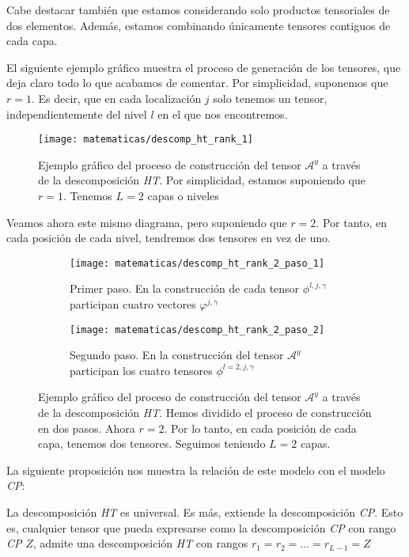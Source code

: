 Cabe destacar también que estamos considerando solo productos tensoriales de dos elementos. Además, estamos combinando únicamente tensores contiguos de cada capa.

El siguiente ejemplo gráfico muestra el proceso de generación de los tensores, que deja claro todo lo que acabamos de comentar. Por simplicidad, suponemos que $r = 1$. Es decir, que en cada localización $j$ solo tenemos un tensor, independientemente del nivel $l$ en el que nos encontremos.

\begin{figure}[H]
	\centering
	\texttt{[image: matematicas/descomp\_ht\_rank\_1]}
	\caption{Ejemplo gráfico del proceso de construcción del tensor $\mathcal{A}^y$ a través de la descomposición \textit{HT}. Por simplicidad, estamos suponiendo que $r = 1$. Tenemos $L = 2$ capas o niveles}
	\label{img:diagrama_ht_simple}
\end{figure}

Veamos ahora este mismo diagrama, pero suponiendo que $r = 2$. Por tanto, en cada posición de cada nivel, tendremos dos tensores en vez de uno.

\begin{figure}[H]
	\centering
	\ajustarsubcaptions
	\begin{subfigure}{.5\textwidth}
		\centering
		\texttt{[image: matematicas/descomp\_ht\_rank\_2\_paso\_1]}
		\caption{Primer paso. En la construcción de cada tensor $\phi^{l, j, \gamma}$ participan cuatro vectores $\varphi^{j, \gamma}$}
	\end{subfigure}%
	\begin{subfigure}{.5\textwidth}
		\centering
		\texttt{[image: matematicas/descomp\_ht\_rank\_2\_paso\_2]}
		\caption{Segundo paso. En la construcción del tensor $\mathcal{A}^y$ participan los cuatro tensores $\phi^{l=2, j, \gamma}$}
	\end{subfigure}
	\caption{Ejemplo gráfico del proceso de construcción del tensor $\mathcal{A}^y$ a través de la descomposición \textit{HT}. Hemos dividido el proceso de construcción en dos pasos. Ahora $r = 2$. Por lo tanto, en cada posición de cada capa, tenemos dos tensores. Seguimos teniendo $L = 2$ capas. }
	\label{img:diagrama_ht_complejo}
\end{figure}

La siguiente proposición nos muestra la relación de este modelo con el modelo \textit{CP}:

\begin{proposicion}
	La descomposición \textit{HT} es universal. Es más, extiende la descomposición \textit{CP}. Esto es, cualquier tensor que pueda expresarse como la descomposición \textit{CP} con rango \textit{CP} $Z$, admite una descomposición \textit{HT} con rangos $r_1 = r_2 = \ldots = r_{L - 1} = Z$
\end{proposicion}

